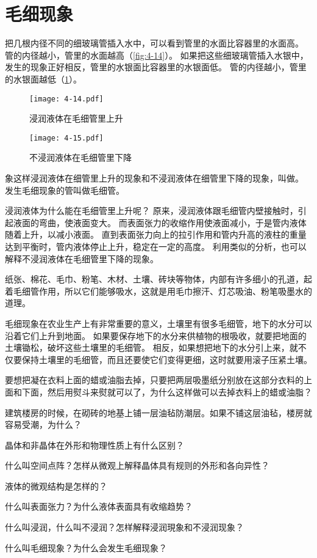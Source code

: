\section{毛细现象}
把几根内径不同的细玻璃管插入水中，可以看到管里的水面比容器里的水面高。
管的内径越小，管里的水面越高（\cref{fig:4-14}）。
如果把这些细玻璃管插入水银中，发生的现象正好相反，管里的水银面比容器里的水银面低。
管的内径越小，管里的水银面越低（\cref{fig:4-15}）。
\begin{figure}
	\begin{minipage}[b]{0.48\linewidth}\centering
		\texttt{[image: 4-14.pdf]}
		\caption{浸润液体在毛细管里上升}\label{fig:4-14}
  \end{minipage}
	\begin{minipage}[b]{0.48\linewidth}\centering
		\texttt{[image: 4-15.pdf]}
		\caption{不浸润液体在毛细管里下降}\label{fig:4-15}
	\end{minipage}
\end{figure}

象这样浸润液体在细管里上升的现象和不浸润液体在细管里下降的现象，叫做。
发生毛细现象的管叫做毛细管。

浸润液体为什么能在毛细管里上升呢？
原来，浸润液体跟毛细管内壁接触时，引起液面的弯曲，使液面变大。
而表面张力的收缩作用使液面减小，于是管内液体随着上升，以减小液面。
直到表面张力向上的拉引作用和管内升高的液柱的重量达到平衡时，管内液体停止上升，稳定在一定的高度。
利用类似的分析，也可以解释不浸润液体在毛细管里下降的现象。

纸张、棉花、毛巾、粉笔、木材、土壤、砖块等物体，内部有许多细小的孔道，起着毛细管作用，所以它们能够吸水，这就是用毛巾擦汗、灯芯吸油、粉笔吸墨水的道理。

毛细现象在农业生产上有非常重要的意义，土壤里有很多毛细管，地下的水分可以沿着它们上升到地面。
如果要保存地下的水分来供植物的根吸收，就要把地面的土壤锄松，破坏这些土壤里的毛细管。
相反，如果想把地下的水分引上来，就不仅要保持土壤里的毛细管，而且还要使它们变得更细，这时就要用滚子压紧土壤。

\begin{Practice}
\begin{question}
	\item 要想把凝在衣料上面的蜡或油脂去掉，只要把两层吸墨纸分别放在这部分衣料的上面和下面，然后用熨斗来熨就可以了，为什么这样做可以去掉衣料上的蜡或油脂？
	\item 建筑楼房的时候，在砌砖的地基上铺一层油毡防潮层。如果不铺这层油毡，楼房就容易受潮，为什么？
\end{question}
\end{Practice}

\begin{Review}
\begin{question}
	\item 晶体和非晶体在外形和物理性质上有什么区别？
	\item 什么叫空间点阵？怎样从微观上解释晶体具有规则的外形和各向异性？
	\item 液体的微观结构是怎样的？
	\item 什么叫表面张力？为什么液体表面具有收缩趋势？
	\item 什么叫浸润，什么叫不浸润？怎样解释浸润現象和不浸润现象？
	\item 什么叫毛细现象？为什么会发生毛细现象？
\end{question}
\end{Review}



